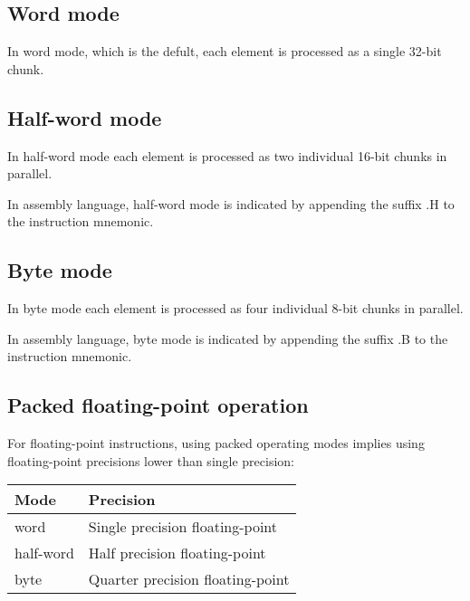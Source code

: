 \subsection{Word mode}

In word mode, which is the defult, each element is processed as a single
32-bit chunk.

\subsection{Half-word mode}

In half-word mode each element is processed as two individual 16-bit chunks in
parallel.

In assembly language, half-word mode is indicated by appending the suffix .H
to the instruction mnemonic.

\subsection{Byte mode}

In byte mode each element is processed as four individual 8-bit chunks in
parallel.

In assembly language, byte mode is indicated by appending the suffix .B to the
instruction mnemonic.

\subsection{Packed floating-point operation}

For floating-point instructions, using packed operating modes implies using
floating-point precisions lower than single precision:

\begin{tabular}{|l|l|}
  \hline
  \textbf{Mode} & \textbf{Precision} \\
  \hline
  word & Single precision floating-point \\
  \hline
  half-word & Half precision floating-point \\
  \hline
  byte & Quarter precision floating-point \\
  \hline
\end{tabular}
